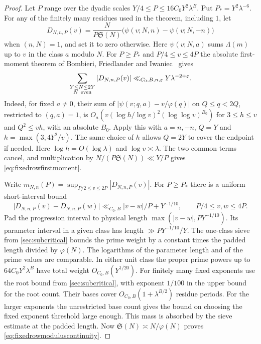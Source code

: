 \documentclass[11pt,a4paper]{article}
\numberwithin{equation}{section}
\newcommand{\SSS}{\mathfrak S}
\begin{document}
\begin{proof}
Let $P$ range over the dyadic scales
$Y/4\le P\le 16C_0Y^2\lambda^B$. Put $P_*=Y^2\lambda^{-6}$.
For any of the finitely many residues used in the theorem,
including $1$, let
\[
 D_{N,n,P}(v)=\frac{N}{P\SSS(N)}
       \bigl(\psi(v;N,n)-\psi(v;N,-n)\bigr)
\]
when $(n,N)=1$, and set it to zero otherwise.
Here $\psi(v;N,a)$ sums $\Lambda(m)$ up to $v$ in the class
$a$ modulo $N$. For $P\ge P_*$ and $P/4\le v\le4P$ the
absolute first-moment theorem of Bombieri, Friedlander
and Iwaniec~\cite{BFI1987} gives
\begin{equation}
 \sum_{\substack{Y\le N\le2Y\\N\ {\rm even}}}|D_{N,n,P}(v)|
 \ll_{C_0,B,n,\varepsilon}Y\lambda^{-2+\varepsilon}.
 \label{eq:fixedrowfirstmoment}
\end{equation}
Indeed, for fixed $a\ne0$, their sum of
$|\psi(v;q,a)-v/\varphi(q)|$ on $Q\le q<2Q$, restricted
to $(q,a)=1$, is
$O_a(v(\log h/\log v)^2(\log\log v)^{B_0})$
for $3\le h\le v$ and $Q^2\le vh$, with an absolute
$B_0$. Apply this with $a=n,-n$, $Q=Y$ and
$h=\max(3,4Y^2/v)$. The same choice of $h$ allows
$Q=2Y$ to cover the endpoint if needed. Here
$\log h=O(\log\lambda)$ and $\log v\asymp\lambda$.
The two common terms cancel, and multiplication by
$N/(P\SSS(N))\ll Y/P$ gives
\cref{eq:fixedrowfirstmoment}.

Write $m_{N,n}(P)=\sup_{P/2\le v\le2P}|D_{N,n,P}(v)|$.
For $P\ge P_*$ there is a uniform short-interval bound
\begin{equation}
 \bigl|D_{N,n,P}(v)-D_{N,n,P}(w)\bigr|
        \ll_{C_0,B} |v-w|/P+Y^{-1/10},
       \qquad P/4\le v,w\le4P .
 \label{eq:fixedrowmoduluscontinuity}
\end{equation}
Pad the progression interval to physical length
$\max(|v-w|,PY^{-1/10})$. Its parameter interval in a
given class has length $\gg PY^{-1/10}/Y$.
The one-class sieve from \cref{sec:subcritical} bounds
the prime weight by a constant times the padded length
divided by $\varphi(N)$. The logarithms of the parameter
length and of the prime values are comparable.
In either unit class the proper prime powers up to
$64C_0Y^2\lambda^B$ have total weight $O_{C_0,B}(Y^{1/20})$.
For finitely many fixed exponents use the root bound
from \cref{sec:subcritical}, with exponent $1/100$ in
the upper bound for the root count. Their bases cover
$O_{C_0,B}(1+\lambda^{B/2})$ residue periods. For the larger exponents
the unrestricted base count gives the bound on choosing
the fixed exponent threshold large enough.
This mass is absorbed by the sieve estimate at the
padded length. Now $\SSS(N)\asymp N/\varphi(N)$ proves
\cref{eq:fixedrowmoduluscontinuity}.


\end{proof}
\end{document}
